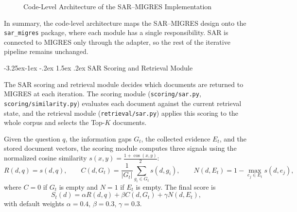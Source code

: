 \documentclass[12pt,a4paper]{report}
\makeatletter
\renewcommand\subsection{\@startsection{subsection}{2}{\z@}%
    {-3.25ex\@plus -1ex \@minus -.2ex}%
    {1.5ex \@plus .2ex}%
    {\normalfont\fontsize{14}{17}\selectfont\bfseries}}
\makeatother
\begin{document}
\begin{figure}[H]
{%
}
\caption{Code-Level Architecture of the SAR--MIGRES Implementation}
\label{fig:code-level-architecture}
\end{figure}

In summary, the code-level architecture maps the SAR--MIGRES design onto
the \texttt{sar\_migres} package, where each module has a single
responsibility. SAR is connected to MIGRES only through the adapter, so
the rest of the iterative pipeline remains unchanged.


\subsection{SAR Scoring and Retrieval Module}

The SAR scoring and retrieval module decides which documents are returned to MIGRES at each iteration. The scoring module (\texttt{scoring/sar.py}, \texttt{scoring/similarity.py}) evaluates each document against the current retrieval state, and the retrieval module (\texttt{retrieval/sar.py}) applies this scoring to the whole corpus and selects the Top-$K$ documents.

Given the question $q$, the information gaps $G_t$, the collected evidence $E_t$, and the stored document vectors, the scoring module computes three signals using the normalized cosine similarity $s(x,y)=\frac{1+\cos(x,y)}{2}$:
\[
R(d,q)=s(d,q), \qquad
C(d,G_t)=\frac{1}{|G_t|}\sum_{g_i\in G_t}s(d,g_i), \qquad
N(d,E_t)=1-\max_{e_j\in E_t}s(d,e_j),
\]
where $C=0$ if $G_t$ is empty and $N=1$ if $E_t$ is empty. The final score is
\[
S_t(d)=\alpha R(d,q)+\beta C(d,G_t)+\gamma N(d,E_t),
\]
with default weights $\alpha=0.4$, $\beta=0.3$, $\gamma=0.3$.
\end{document}
